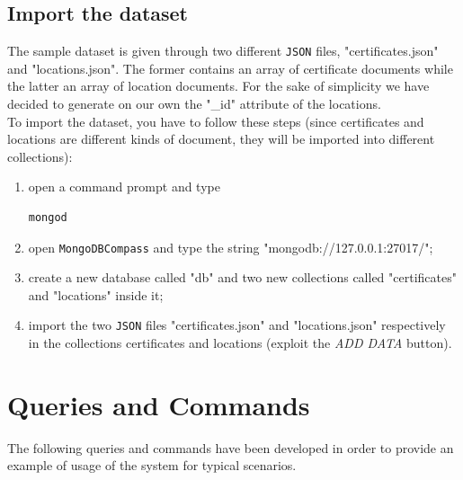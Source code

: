 \documentclass{article}
\begin{document}
\subsection{Import the dataset}\label{import}
The sample dataset is given through two different \verb|JSON| files, "certificates.json" and "locations.json". The former contains an array of certificate documents while the latter an array of location documents. For the sake of simplicity we have decided to generate on our own the "\_id" attribute of the locations.\\
To import the dataset, you have to follow these steps (since certificates and locations are different kinds of document, they will be imported into different collections):
\begin{enumerate}
    \item open a command prompt and type \begin{lstlisting}[language=bash]
    mongod
\end{lstlisting}
\item open \verb|MongoDBCompass| and type the string "mongodb://127.0.0.1:27017/";
\item create a new database called "db" and two new collections called "certificates" and "locations" inside it;
\item import the two \verb|JSON| files "certificates.json" and "locations.json" respectively in the collections certificates and locations (exploit the \textit{ADD DATA} button).
\end{enumerate}
\section{Queries and Commands}
The following queries and commands have been developed in order to provide an example of usage of the system for typical scenarios.
\end{document}
